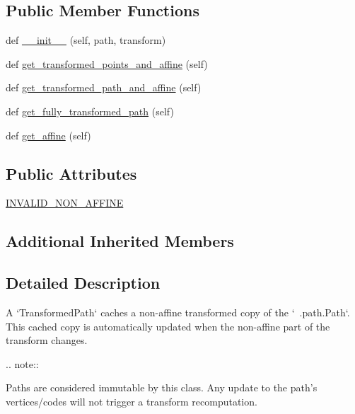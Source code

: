 \subsection*{Public Member Functions}
\begin{DoxyCompactItemize}
\item 
def \hyperlink{classmatplotlib_1_1transforms_1_1TransformedPath_a8e6aab2c3cfc8dc7c6b946127fb20b29}{\+\_\+\+\_\+init\+\_\+\+\_\+} (self, path, transform)
\item 
def \hyperlink{classmatplotlib_1_1transforms_1_1TransformedPath_a29dcaf6458ee4e6c83b07b27a22e4895}{get\+\_\+transformed\+\_\+points\+\_\+and\+\_\+affine} (self)
\item 
def \hyperlink{classmatplotlib_1_1transforms_1_1TransformedPath_afa5ef708c5f2524371af6493c49b4c0a}{get\+\_\+transformed\+\_\+path\+\_\+and\+\_\+affine} (self)
\item 
def \hyperlink{classmatplotlib_1_1transforms_1_1TransformedPath_a91cfb0e7175fb03c40b13d06658a1e91}{get\+\_\+fully\+\_\+transformed\+\_\+path} (self)
\item 
def \hyperlink{classmatplotlib_1_1transforms_1_1TransformedPath_a07347ba55573daea8ed8491413ed71f7}{get\+\_\+affine} (self)
\end{DoxyCompactItemize}
\subsection*{Public Attributes}
\begin{DoxyCompactItemize}
\item 
\hyperlink{classmatplotlib_1_1transforms_1_1TransformedPath_a3a044a40e9a73c51b511feaecdac0e9b}{I\+N\+V\+A\+L\+I\+D\+\_\+\+N\+O\+N\+\_\+\+A\+F\+F\+I\+NE}
\end{DoxyCompactItemize}
\subsection*{Additional Inherited Members}


\subsection{Detailed Description}
\begin{DoxyVerb}A `TransformedPath` caches a non-affine transformed copy of the
`~.path.Path`.  This cached copy is automatically updated when the
non-affine part of the transform changes.

.. note::

    Paths are considered immutable by this class. Any update to the
    path's vertices/codes will not trigger a transform recomputation.\end{DoxyVerb}
 


